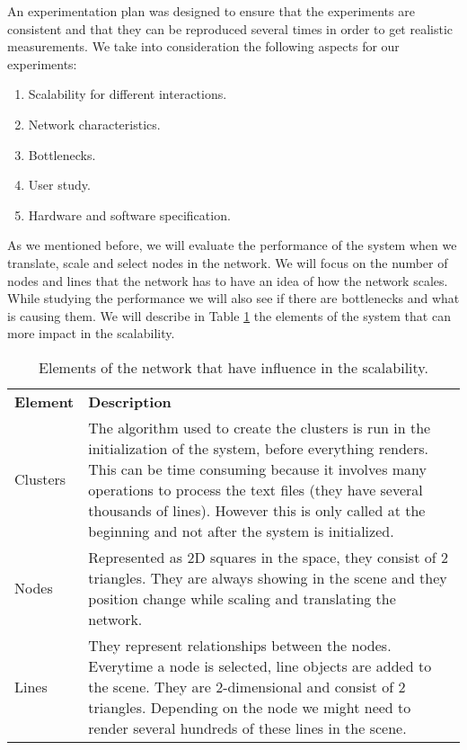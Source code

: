 An experimentation plan was designed to ensure that the experiments are consistent and that they can be reproduced several times in order to get realistic measurements. We take into consideration the following aspects for our experiments:
\begin{enumerate}
  \item Scalability for different interactions.
  \item Network characteristics.
  \item Bottlenecks.
  \item User study.
  \item Hardware and software specification.
\end{enumerate}

As we mentioned before, we will evaluate the performance of the system when we translate, scale and select nodes in the network. We will focus on the number of nodes and lines that the network has to have an idea of how the network scales. While studying the performance we will also see if there are bottlenecks and what is causing them. We will describe in Table \ref{tab:network-elements} the elements of the system that can more impact in the scalability.

\begin{table}[h!]
\centering
\begin{tabular}{l p{9cm}}
\textbf{Element} & \textbf{Description} \\
Clusters & The algorithm used to create the clusters is run in the initialization of the system, before everything renders. This can be time consuming because it involves many operations to process the text files (they have several thousands of lines). However this is only called at the beginning and not after the system is initialized. \\
Nodes   & Represented as 2D squares in the space, they consist of 2 triangles. They are always showing in the scene and they position change while scaling and translating the network.  \\
Lines & They represent relationships between the nodes. Everytime a node is selected, line objects are added to the scene. They are 2-dimensional and consist of 2 triangles. Depending on the node we might need to render several hundreds of these lines in the scene. \\
\end{tabular}
\caption{Elements of the network that have influence in the scalability.}
\label{tab:network-elements}
\end{table}

